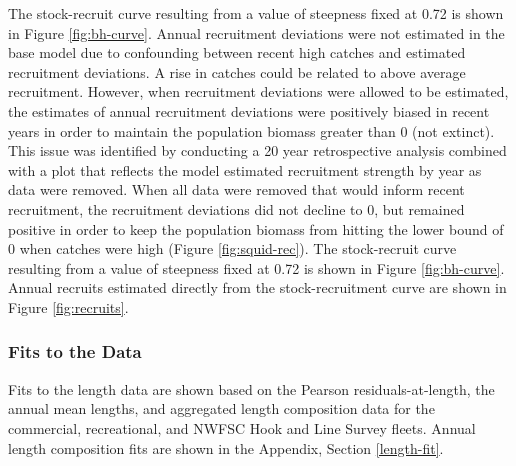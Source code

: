 \documentclass[11pt,
  english,
  a4paper,
]{article}
\begin{document}
\leavevmode\tagmcend\tagstructend\par


The stock-recruit curve resulting from a value of steepness fixed at 0.72 is shown in Figure \ref{fig:bh-curve}. Annual recruitment deviations were not estimated in the base model due to confounding between recent high catches and estimated recruitment deviations. A rise in catches could be related to above average recruitment. However, when recruitment deviations were allowed to be estimated, the estimates of annual recruitment deviations were positively biased in recent years in order to maintain the population biomass greater than 0 (not extinct). This issue was identified by conducting a 20 year retrospective analysis combined with a plot that reflects the model estimated recruitment strength by year as data were removed. When all data were removed that would inform recent recruitment, the recruitment deviations did not decline to 0, but remained positive in order to keep the population biomass from hitting the lower bound of 0 when catches were high (Figure \ref{fig:squid-rec}). The stock-recruit curve resulting from a value of steepness fixed at 0.72 is shown in Figure \ref{fig:bh-curve}. Annual recruits estimated directly from the stock-recruitment curve are shown in Figure \ref{fig:recruits}.

\leavevmode\tagmcend\tagstructend\par


\hypertarget{fits-to-the-data}{%
\subsubsection{Fits to the Data}\label{fits-to-the-data}}

\leavevmode\tagmcend\tagstructend


Fits to the length data are shown based on the Pearson residuals-at-length, the annual mean lengths, and aggregated length composition data for the commercial, recreational, and NWFSC Hook and Line Survey fleets. Annual length composition fits are shown in the Appendix, Section \ref{length-fit}.

\leavevmode\tagmcend\tagstructend\par

\end{document}

